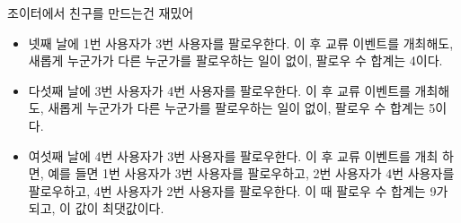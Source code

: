 \begin{problem}{조이터에서 친구를 만드는건 재밌어}
\begin{itemize}
\item 넷째 날에 1번 사용자가 3번 사용자를 팔로우한다. 이 후 교류 이벤트를 개최해도, 새롭게 누군가가 다른 누군가를 팔로우하는 일이 없이, 팔로우 수 합계는 4이다.
\item 다섯째 날에 3번 사용자가 4번 사용자를 팔로우한다. 이 후 교류 이벤트를 개최해도, 새롭게 누군가가 다른 누군가를 팔로우하는 일이 없이, 팔로우 수 합계는 5이다.
\item 여섯째 날에 4번 사용자가 3번 사용자를 팔로우한다. 이 후 교류 이벤트를 개최 하면, 예를 들면 1번 사용자가 3번 사용자를 팔로우하고, 2번 사용자가 4번 사용자를 팔로우하고, 4번 사용자가 2번 사용자를 팔로우한다. 이 때 팔로우 수 합계는 9가 되고, 이 값이 최댓값이다.
\end{itemize}
\begin{example}
\end{example}

\end{problem}

